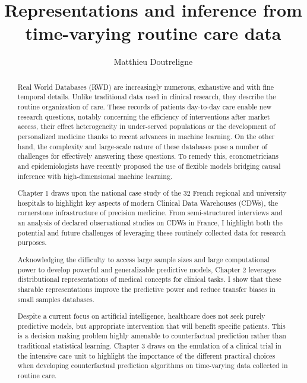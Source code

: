 \documentclass{report}
\title{
  Representations and inference from time-varying routine care data 
}
\author{
  Matthieu Doutreligne \\
}
\begin{document}
\maketitle


\begin{abstract}

  Real World Databases (RWD) are increasingly numerous, exhaustive and with fine
  temporal details. Unlike traditional data used in clinical research, they
  describe the routine organization of care. These records of patients
  day-to-day care enable new research questions, notably concerning the
  efficiency of interventions after market access, their effect heterogeneity in
  under-served populations or the development of personalized medicine thanks to
  recent advances in machine learning. On the other hand, the complexity and
  large-scale nature of these databases pose a number of challenges for
  effectively answering these questions. To remedy this, econometricians and
  epidemiologists have recently proposed the use of flexible models bridging
  causal inference with high-dimensional machine learning.

  Chapter 1 draws upon the national case study of the 32 French regional and
  university hospitals to highlight key aspects of modern Clinical Data
  Warehouses (CDWs), the cornerstone infrastructure of precision medicine. From
  semi-structured interviews and an analysis of declared observational studies
  on CDWs in France, I highlight both the potential and future challenges of
  leveraging these routinely collected data for research purposes.

  Acknowledging the difficulty to access large sample sizes and large
  computational power to develop powerful and generalizable predictive models,
  Chapter 2 leverages distributional representations of medical concepts for
  clinical tasks. I show that these sharable representations improve the
  predictive power and reduce transfer biases in small samples databases.

  Despite a current focus on artificial intelligence, healthcare does not seek
  purely predictive models, but appropriate intervention that will benefit
  specific patients. This is a decision making problem highly amenable to
  counterfactual prediction rather than traditional statistical learning.
  Chapter 3 draws on the emulation of a clinical trial in the intensive care
  unit to highlight the importance of the different practical choices when
  developing counterfactual prediction algorithms on time-varying data collected
  in routine care.


\end{abstract}
\end{document}

